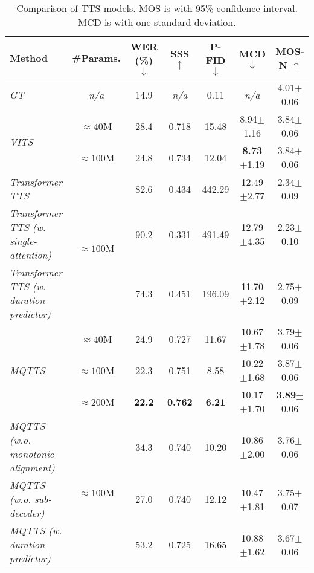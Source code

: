 \begin{table*}[!htb]
    \centering
    \caption{Comparison of TTS models. MOS is with 95\% confidence interval. MCD is with one standard deviation.} %
    \label{tab:architecture:Giga}
    \begin{tabular}{l|c|c c c c|c}
        \toprule
        Method & \#Params. & WER (\%) $\downarrow$ & SSS $\uparrow$ & P-FID $\downarrow$ & MCD $\downarrow$ & MOS-N $\uparrow$ \\
        \midrule
        \textit{GT} & \textit{n/a} & 14.9 & \textit{n/a} & 0.11 & \textit{n/a} & 4.01$\pm$0.06 \\
        \midrule
        \multirow{2}{*}{\textit{VITS}} & $\approx 40$M & 28.4 & 0.718 & 15.48 & 8.94$\pm$1.16 & 3.84$\pm$0.06\\
         & $\approx 100$M & 24.8 & 0.734 & 12.04 & \textbf{8.73}$\pm$1.19 & 3.84$\pm$0.06\\
        \midrule
        \textit{Transformer TTS} & \multirow{3}{*}{$\approx 100$M} & 82.6 & 0.434 & 442.29 & 12.49$\pm$2.77 & 2.34$\pm$0.09\\
        \textit{Transformer TTS (w. single-attention)} & & 90.2 & 0.331 & 491.49 & 12.79$\pm$4.35 & 2.23$\pm$0.10\\
        \textit{Transformer TTS (w. duration predictor)} & & 74.3 & 0.451 & 196.09 & 11.70$\pm$2.12 & 2.75$\pm$0.09\\
        \midrule
        \multirow{3}{*}{\textit{MQTTS}} & $\approx 40$M & 24.9 & 0.727 & 11.67 & 10.67$\pm$1.78 & 3.79$\pm$0.06\\
         & $\approx 100$M & 22.3 & 0.751 & 8.58 & 10.22$\pm$1.68 & 3.87$\pm$0.06\\
         & $\approx 200$M & \textbf{22.2} & \textbf{0.762} & \textbf{6.21} & 10.17$\pm$1.70 & \textbf{3.89}$\pm$0.06\\
        \midrule
        \textit{MQTTS (w.o. monotonic alignment)} & \multirow{3}{*}{$\approx 100$M} & 34.3 & 0.740 & 10.20 & 10.86$\pm$2.00 & 3.76$\pm$0.06\\
        \textit{MQTTS (w.o. sub-decoder)} & & 27.0 & 0.740 & 12.12 & 10.47$\pm$1.81 & 3.75$\pm$0.07\\
        \textit{MQTTS (w. duration predictor)} & & 53.2 & 0.725 & 16.65 & 10.88$\pm$1.62 & 3.67$\pm$0.06\\
        \bottomrule
    \end{tabular}
\end{table*}
